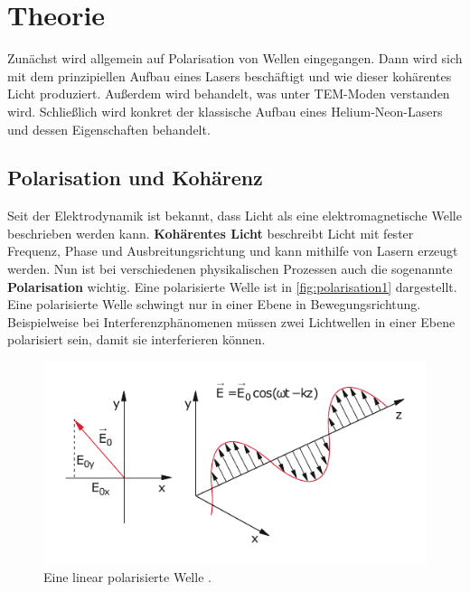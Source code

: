 \section{Theorie}
\label{sec:Theorie}

Zunächst wird allgemein auf Polarisation von Wellen eingegangen.
Dann wird sich mit dem prinzipiellen Aufbau eines Lasers beschäftigt und wie dieser kohärentes Licht produziert.
Außerdem wird behandelt, was unter TEM-Moden verstanden wird.
Schließlich wird konkret der klassische Aufbau eines Helium-Neon-Lasers und dessen Eigenschaften behandelt.

\subsection{Polarisation und Kohärenz} \label{sec:polarisation}
Seit der Elektrodynamik ist bekannt, dass Licht als eine elektromagnetische Welle beschrieben werden kann.
\textbf{Kohärentes Licht} beschreibt Licht mit fester Frequenz, Phase und Ausbreitungsrichtung und kann mithilfe von Lasern erzeugt werden.
Nun ist bei verschiedenen physikalischen Prozessen auch die sogenannte \textbf{Polarisation} wichtig.
Eine polarisierte Welle ist in \autoref{fig:polarisation1} dargestellt.
Eine polarisierte Welle schwingt nur in einer Ebene in Bewegungsrichtung.
Beispielweise bei Interferenzphänomenen müssen zwei Lichtwellen in einer Ebene polarisiert sein, damit sie interferieren können.
\begin{figure}
    \centering
    \includegraphics[width = 0.7 \linewidth]{pictures/polarisation1.pdf}
    \caption{Eine linear polarisierte Welle \cite{demtroeder2}.}
    \label{fig:polarisation1}
\end{figure}
